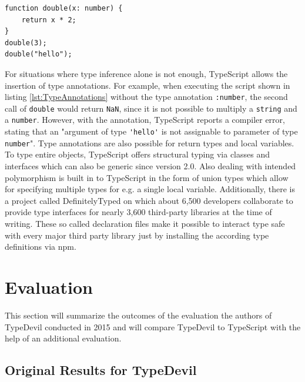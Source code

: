 \documentclass[runningheads,a4paper]{llncs}
\begin{document}
\medskip\medskip
\lstset{language=javascript}
\begin{minipage}{\linewidth}
\begin{lstlisting}[frame=single, caption=Type Annotations, label={lst:TypeAnnotations}]
function double(x: number) {
    return x * 2;
}
double(3);
double("hello");
\end{lstlisting}
\end{minipage}
For situations where type inference alone is not enough, TypeScript allows the insertion of type annotations.
For example, when executing the script shown in listing \ref{lst:TypeAnnotations} without the type annotation \lstinline[columns=fixed]{:number}, the second call of \lstinline[columns=fixed]{double} would return \lstinline[columns=fixed]{NaN}, since it is not possible to multiply a \lstinline[columns=fixed]{string} and a \lstinline[columns=fixed]{number}.
However, with the annotation, TypeScript reports a compiler error, stating that an "argument of type \lstinline[columns=fixed]{'hello'} is not assignable to parameter of type \lstinline[columns=fixed]{number}".
Type annotations are also possible for return types and local variables.
To type entire objects, TypeScript offers structural typing via classes and interfaces which can also be generic since version 2.0.
Also dealing with intended polymorphism is built in to TypeScript in the form of union types which allow for specifying multiple types for e.g. a single local variable.
Additionally, there is a project called DefinitelyTyped \cite{DefinitelyTyped} on which about 6,500 developers collaborate to provide type interfaces for nearly 3,600 third-party libraries at the time of writing.
These so called declaration files make it possible to interact type safe with every major third party library just by installing the according type definitions via npm.

\section{Evaluation}

This section will summarize the outcomes of the evaluation the authors of TypeDevil conducted in 2015 and will compare TypeDevil to TypeScript with the help of an additional evaluation.

\subsection{Original Results for TypeDevil}
\end{document}
